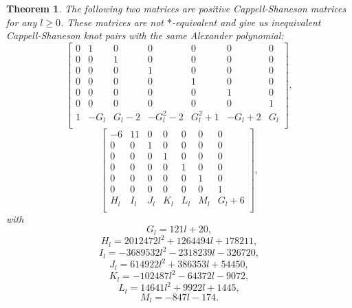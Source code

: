 \documentclass[12pt]{amsart}
\theoremstyle{plain}
\newtheorem{theorem}{Theorem}[section]
\theoremstyle{definition}
\theoremstyle{remark}
\renewcommand{\(}{\big(}
\renewcommand{\)}{\big)}
\theoremstyle{plain}
\theoremstyle{definition}
\begin{document}
\begin{theorem}
    The following two matrices are positive Cappell-Shaneson matrices for any $l \ge 0$. These matrices are not $*$-equivalent and give us inequivalent Cappell-Shaneson knot pairs with the same Alexander polynomial:
    \[
        \begin{bmatrix}
    		0 & 1 & 0 & 0 & 0 & 0 & 0\\
    		0 & 0 & 1 & 0 & 0 & 0 & 0\\
    		0 & 0 & 0 & 1 & 0 & 0 & 0\\
                0 & 0 & 0 & 0 & 1 & 0 & 0\\
                0 & 0 & 0 & 0 & 0 & 1 & 0\\
                0 & 0 & 0 & 0 & 0 & 0 & 1\\
                1 & -G_l & G_l-2 & -G_l^2-2 & G_l^2+1 & -G_l+2 & G_l\\
    		\end{bmatrix},
    \]
    \[
        \begin{bmatrix}
    	-6 & 11 & 0 & 0 & 0 & 0 & 0\\
            0 & 0 & 1 & 0 & 0 & 0 & 0\\
            0 & 0 & 0 & 1 & 0 & 0 & 0\\
            0 & 0 & 0 & 0 & 1 & 0 & 0\\
            0 & 0 & 0 & 0 & 0 & 1 & 0\\
            0 & 0 & 0 & 0 & 0 & 0 & 1\\
            H_l & I_l & J_l & K_l & L_l & M_l & G_l+6\\
    		\end{bmatrix},
    \] with
    \[
    G_l = 121l+20,
    \]
    \[
    H_l = 2012472l^2+1264494l+178211,
    \]
    \[
    I_l = -3689532l^2-2318239l-326720,
    \]
    \[
    J_l = 614922l^2+386353l+54450,
    \]
    \[
    K_l = -102487l^2-64372l-9072,
    \]
    \[
    L_l = 14641l^2+9922l+1445,
    \]
    \[
    M_l = -847l-174.
    \]
\end{theorem}
\end{document}
